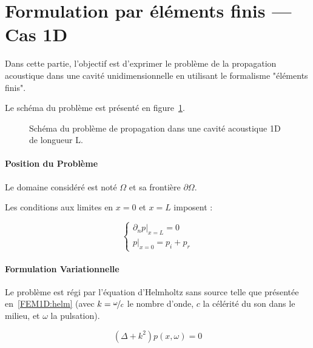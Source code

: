 \newcommand\DP{\delta p}
\newcommand\dd{\mathrm{d}}
\newcommand\ul{\underline}
\newcommand\uul[1]{\underline{\underline{#1}}}

\section{Formulation par éléments finis --- Cas 1D}

Dans cette partie, l'objectif est d'exprimer le problème de la propagation acoustique dans une cavité unidimensionnelle
en utilisant le formalisme "éléments finis".

Le schéma du problème est présenté en figure~\ref{fig:FEM:propa_1D}.

\begin{figure}[!ht]
	\centering
	
	\caption{\label{fig:FEM:propa_1D}Schéma du problème de propagation dans une cavité acoustique 1D de longueur L.}
\end{figure}

\paragraph{Position du Problème}

Le domaine considéré est noté $\Omega$ et sa frontière $\partial\Omega$.

Les conditions aux limites en $x=0$ et $x=L$ imposent :

\begin{equation}
	\left\{\begin{array}{l}
	\left.\partial_np\right|_{x=L} = 0\\
	\left.p\right|_{x=0} = p_i+p_r
	\end{array}\right. \label{FEM1D:BC}
\end{equation}


\paragraph{Formulation Variationnelle}

Le problème est régi par l'équation d'Helmholtz sans source telle que présentée en~\eqref{FEM1D:helm} (avec $k =
\nicefrac{\omega}{c}$ le nombre d'onde, $c$ la célérité du son dans le milieu, et $\omega$ la pulsation).

\begin{equation}
	(\Delta + k^2)p(x,\omega) = 0 \label{FEM1D:helm}
\end{equation}

